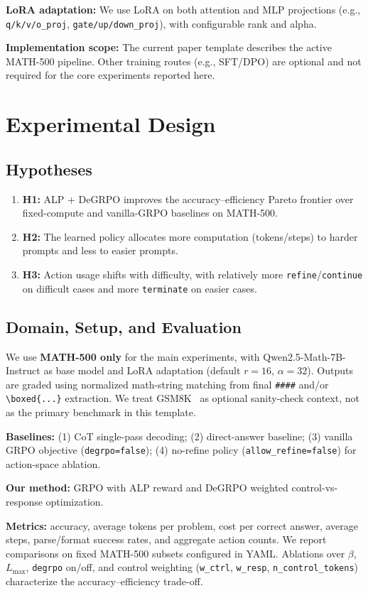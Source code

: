 \documentclass{article}
\begin{document}
\textbf{LoRA adaptation:} We use LoRA on both attention and MLP projections (e.g., \texttt{q/k/v/o\_proj}, \texttt{gate/up/down\_proj}), with configurable rank and alpha.

\textbf{Implementation scope:} The current paper template describes the active MATH-500 pipeline. Other training routes (e.g., SFT/DPO) are optional and not required for the core experiments reported here.

\section{Experimental Design}

\subsection{Hypotheses}

\begin{enumerate}
    \item \textbf{H1:} ALP + DeGRPO improves the accuracy--efficiency Pareto frontier over fixed-compute and vanilla-GRPO baselines on MATH-500.
    \item \textbf{H2:} The learned policy allocates more computation (tokens/steps) to harder prompts and less to easier prompts.
    \item \textbf{H3:} Action usage shifts with difficulty, with relatively more \texttt{refine}/\texttt{continue} on difficult cases and more \texttt{terminate} on easier cases.
\end{enumerate}

\subsection{Domain, Setup, and Evaluation}

We use \textbf{MATH-500 only} for the main experiments, with Qwen2.5-Math-7B-Instruct as base model and LoRA adaptation (default $r{=}16$, $\alpha{=}32$). Outputs are graded using normalized math-string matching from final \texttt{\#\#\#\#} and/or \texttt{\textbackslash boxed\{...\}} extraction. We treat GSM8K~\citep{cobbe2021gsm8k} as optional sanity-check context, not as the primary benchmark in this template.

\textbf{Baselines:} (1) CoT single-pass decoding; (2) direct-answer baseline; (3) vanilla GRPO objective (\texttt{degrpo=false}); (4) no-refine policy (\texttt{allow\_refine=false}) for action-space ablation.

\textbf{Our method:} GRPO with ALP reward and DeGRPO weighted control-vs-response optimization.

\textbf{Metrics:} accuracy, average tokens per problem, cost per correct answer, average steps, parse/format success rates, and aggregate action counts. We report comparisons on fixed MATH-500 subsets configured in YAML. Ablations over $\beta$, $L_{\max}$, \texttt{degrpo} on/off, and control weighting (\texttt{w\_ctrl}, \texttt{w\_resp}, \texttt{n\_control\_tokens}) characterize the accuracy--efficiency trade-off.



\end{document}
